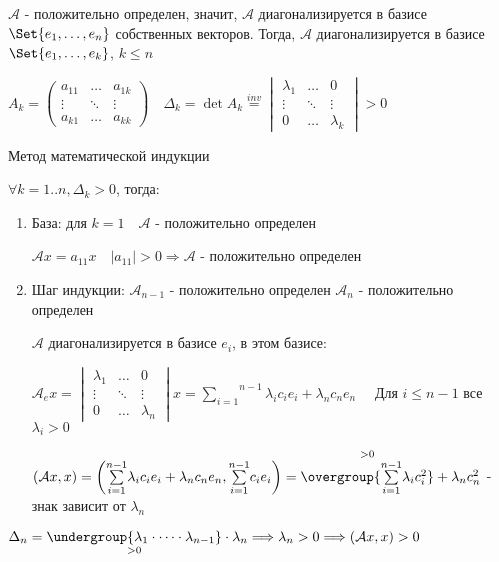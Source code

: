 \documentclass[12pt]{article}
\begin{document}
    \begin{MyProof}

        \fbox{$\Longrightarrow$} $\mathcal{A}$ - положительно определен, значит, $\mathcal{A}$ диагонализируется в базисе $\Set{e_1, \dots, e_n}$ собственных векторов.
        Тогда, $\mathcal{A}$ диагонализируется в базисе $\Set{e_1, \dots, e_k}$, $k \leq n$

        $A_k = \begin{pmatrix}a_{11} & \dots & a_{1k} \\ \vdots & \ddots & \vdots \\ a_{k1} & \dots & a_{kk}\end{pmatrix} \quad
        \Delta_k = \det A_k \stackrel{inv}{=} \begin{vmatrix}\lambda_{1} & \dots & 0 \\ \vdots & \ddots & \vdots \\ 0 & \dots & \lambda_{k}\end{vmatrix} > 0$

        \fbox{$\Longleftarrow$} Метод математической индукции

        $\forall k = 1..n, \Delta_k > 0$, тогда:

        \begin{enumerate}
            \item База: для $k = 1 \quad \mathcal{A}$ - положительно определен

            $\mathcal{A}x = a_{11}x \quad |a_{11}| > 0 \Longrightarrow \mathcal{A}$ - положительно определен

            \item Шаг индукции: $\mathcal{A}_{n-1}$ - положительно определен \Longrightarrow $\mathcal{A}_n$ - положительно определен

            $\mathcal{A}$ диагонализируется в базисе ${e_i}$, в этом базисе:
            
            $\mathcal{A}_e x =
            \begin{vmatrix}\lambda_{1} & \dots & 0 \\ \vdots & \ddots & \vdots \\ 0 & \dots & \lambda_{n}\end{vmatrix}x =
            \overset{n - 1}{\underset{i = 1}{\sum}}\lambda_i c_i e_i + \lambda_n c_n e_n \quad$ Для $i \leq n - 1$ все $\lambda_i > 0$

            $(\mathcal{A}x, x) = \left(\overset{n - 1}{\underset{i = 1}{\sum}} \lambda_i c_i e_i + \lambda_n c_n e_n,
            \overset{n - 1}{\underset{i = 1}{\sum}} c_i e_i\right) = \overset{> 0}{\overgroup{\overset{n - 1}{\underset{i = 1}{\sum}} \lambda_i c_i^2}} + \lambda_n c_n^2$ - знак зависит от $\lambda_n$
        \end{enumerate}

        $\Delta_n = \underset{> 0}{\undergroup{\lambda_1 \cdot \dots \cdot \lambda_{n-1}}} \cdot \lambda_n
        \Longrightarrow \lambda_n > 0 \Longrightarrow (\mathcal{A}x, x) > 0$

    \end{MyProof}
\end{document}
